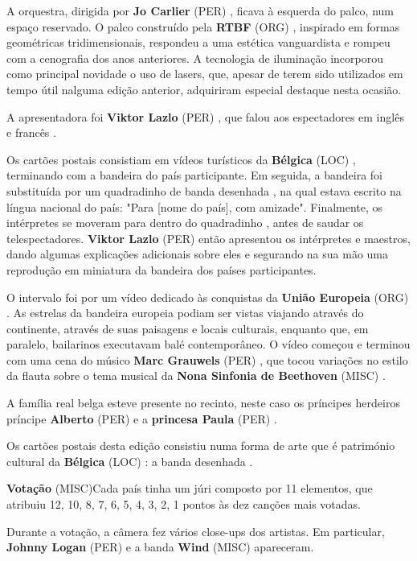 \documentclass[12pt,a4paper]{article}
\begin{document}
A orquestra, dirigida por \textbf{Jo Carlier} (PER) , ficava à esquerda do palco, num espaço reservado. O palco construído pela \textbf{RTBF} (ORG) , inspirado em formas geométricas tridimensionais, respondeu a uma estética vanguardista e rompeu com a cenografia dos anos anteriores. A tecnologia de iluminação incorporou como principal novidade o uso de lasers, que, apesar de terem sido utilizados em tempo útil nalguma edição anterior, adquiriram especial destaque nesta ocasião.

A apresentadora foi \textbf{Viktor Lazlo} (PER) , que falou aos espectadores em inglês e francês .

Os cartões postais consistiam em vídeos turísticos da \textbf{Bélgica} (LOC) , terminando com a bandeira do país participante. Em seguida, a bandeira foi substituída por um quadradinho de banda desenhada , na qual estava escrito na língua nacional do país: "Para [nome do país], com amizade". Finalmente, os intérpretes se moveram para dentro do quadradinho , antes de saudar os telespectadores. \textbf{Viktor Lazlo} (PER) então apresentou os intérpretes e maestros, dando algumas explicações adicionais sobre eles e segurando na sua mão uma reprodução em miniatura da bandeira dos países participantes.

O intervalo foi por um vídeo dedicado às conquistas da \textbf{União Europeia} (ORG) . As estrelas da bandeira europeia podiam ser vistas viajando através do continente, através de suas paisagens e locais culturais, enquanto que, em paralelo, bailarinos executavam balé contemporâneo. O vídeo começou e terminou com uma cena do músico \textbf{Marc Grauwels} (PER) , que tocou variações no estilo da flauta sobre o tema musical da \textbf{Nona Sinfonia de Beethoven} (MISC) .

A família real belga esteve presente no recinto, neste caso os príncipes herdeiros príncipe \textbf{Alberto} (PER) e a \textbf{princesa Paula} (PER) .

Os cartões postais desta edição consistiu numa forma de arte que é património cultural da \textbf{Bélgica} (LOC) : a banda desenhada .



\textbf{Votação} (MISC)Cada país tinha um júri composto por 11 elementos, que atribuiu 12, 10, 8, 7, 6, 5, 4, 3, 2, 1 pontos às dez canções mais votadas.

Durante a votação, a câmera fez vários close-ups dos artistas. Em particular, \textbf{Johnny Logan} (PER) e a banda \textbf{Wind} (MISC) apareceram.
\end{document}
